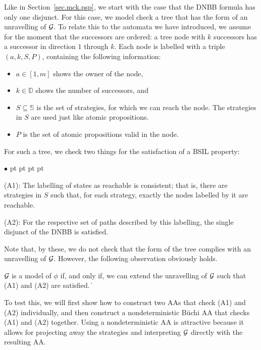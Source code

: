 \documentclass[11pt]{article}
\newcommand{\calg}{{\cal G}}
\newcommand{\bbbbd}{{\mathbb D}}
\newcommand{\bbbbs}{{\mathbb S}}
\def\qed{\ifmmode\|\else{\unskip\nobreak\hfil
\penalty50\hskip1em\null\nobreak\hfil$\blacksquare$
\parfillskip=0pt\finalhyphendemerits=0\endgraf}\fi}
\newenvironment{list1}{\begin{list}{$\bullet$}
{\topsep 0 pt \parsep 0 pt \partopsep 0 pt \itemsep 0 pt}}{\end{list}}
\begin{document}
Like in Section~\ref{sec.mck.psp}, 
we start with the case that the DNBB formula has only one disjunct.
For this case, we model check a tree that has the form 
of an unravelling of $\calg$.
To relate this to the automata we have introduced, 
we assume for the moment that the successors are ordered: 
a tree node with $k$ successors has a successor in direction $1$ through $k$.
Each node is labelled with a triple $(a,k,S,P)$, 
containing the following information:
\begin{itemize}
\item $a \in [1,m]$ shows the owner of the node,
\item $k \in \bbbbd$ shows the number of successors, and
\item $S\subseteq \bbbbs$ is the set of strategies, 
  for which we can reach the node.
  The strategies in $S$ are used just like atomic propositions.
\item $P$ is the set of atomic propositions valid in the node.
\end{itemize}
For such a tree, we check two things for the satisfaction of 
a BSIL property:
\begin{list1}
\item[(A1):] The labelling of states as reachable is consistent; 
  that is, there are strategies in $S$ such that, 
  for each strategy, exactly the nodes labelled by it are reachable.
\item[(A2):] For the respective set of paths described by this labelling, 
  the single disjunct of the DNBB is satisfied.
\end{list1}  
Note that, by these, we do not check that the form of 
the tree complies with an unravelling of $\calg$.
%
However, the following observation obviously holds.

{\lemma \label{lemma.A1.A2} 
$\calg$ is a model of $\phi$ if, and only if, 
we can extend the unravelling of $\calg$ such that (A1) and (A2) 
are satisfied.
} 
\qed 

To test this, we will first show how to construct two AAs that 
check (A1) and (A2) individually, and 
then construct a nondeterministic B\"uchi AA that checks (A1) and (A2) 
together.
Using a nondeterministic AA is attractive because it allows 
for projecting away the strategies and interpreting $\calg$ directly 
with the resulting AA.
\end{document}
